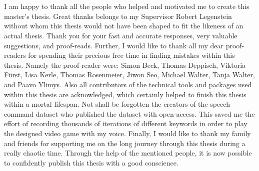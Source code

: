 
\chapter*{}
I am happy to thank all the people who helped and motivated me to create this master's thesis.
Great thanks belongs to my Supervisor Robert Legenstein without whom this thesis would not have been shaped to fit the likeness of an actual thesis.
Thank you for your fast and accurate responses, very valuable suggestions, and proof-reads.
Further, I would like to thank all my dear proof-readers for spending their precious free time in finding mistakes within this thesis.
Namely the proof-reader were: Simon Beck, Thomas Deppisch, Viktoria Fürst, Lisa Kerle, Thomas Rosenmeier, Jiwon Seo, Michael Walter, Tanja Walter, and Paavo Ylimys.
Also all contributors of the technical tools and packages used within this thesis are acknowledged, which certainly helped to finish this thesis within a mortal lifespan.
Not shall be forgotten the creators of the speech command dataset who published the dataset with open-access.
This saved me the effort of recording thousands of iterations of different keywords in order to play the designed video game with my voice.
Finally, I would like to thank my family and friends for supporting me on the long journey through this thesis during a really chaotic time.
Through the help of the mentioned people, it is now possible to confidently publish this thesis with a good conscience.